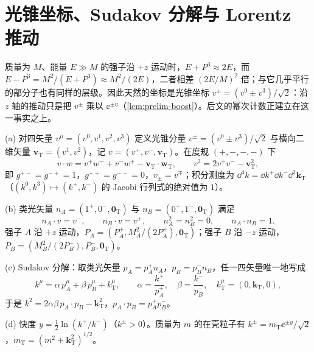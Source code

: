 \section{光锥坐标、Sudakov 分解与 Lorentz 推动}\label{sec:prelim-lightfront}

质量为 $M$、能量 $E\gg M$ 的强子沿 $+z$ 运动时，$E+P^3\approx2E$，而 $E-P^3=M^2/(E+P^3)\approx M^2/(2E)$，二者相差 $(2E/M)^2$ 倍；与它几乎平行的部分子也有同样的层级。因此天然的坐标是光锥坐标 $v^\pm=(v^0\pm v^3)/\sqrt2$：沿 $z$ 轴的推动只是把 $v^\pm$ 乘以 $\ee^{\pm\eta}$（\cref{lem:prelim-boost}）。后文的幂次计数正建立在这一事实之上。

\begin{definition}\label{def:prelim-lightfront}
(a) 对四矢量 $v^\mu=(v^0,v^1,v^2,v^3)$ 定义光锥分量 $v^\pm=(v^0\pm v^3)/\sqrt2$ 与横向二维矢量 $\mathbf v_{\mathrm T}=(v^1,v^2)$，记 $v=(v^+,v^-,\mathbf v_{\mathrm T})$。在度规 $(+,-,-,-)$ 下
\begin{equation}\label{eq:prelim-lc-dot}
v\cdot w=v^+w^-+v^-w^+-\mathbf v_{\mathrm T}\cdot\mathbf w_{\mathrm T},\qquad v^2=2v^+v^--\mathbf v_{\mathrm T}^2 ,
\end{equation}
即 $g^{+-}=g^{-+}=1$，$g^{++}=g^{--}=0$，$v_\pm=v^\mp$；积分测度为 $\dd^4k=\dd k^+\dd k^-\dd^2\mathbf k_{\mathrm T}$（$(k^0,k^3)\mapsto(k^+,k^-)$ 的 Jacobi 行列式的绝对值为 $1$）。%
\par
(b) 类光矢量 $n_A=(1^+,0^-,\mathbf 0_{\mathrm T})$ 与 $n_B=(0^+,1^-,\mathbf 0_{\mathrm T})$ 满足
\begin{equation}\label{eq:prelim-nAnB}
n_A\cdot v=v^-,\qquad n_B\cdot v=v^+,\qquad n_A^2=n_B^2=0,\qquad n_A\cdot n_B=1 .
\end{equation}
强子 $A$ 沿 $+z$ 运动，$P_A=(P_A^+,M_A^2/(2P_A^+),\mathbf 0_{\mathrm T})$；强子 $B$ 沿 $-z$ 运动，$P_B=(M_B^2/(2P_B^-),P_B^-,\mathbf 0_{\mathrm T})$。
\par
(c) Sudakov 分解：取类光矢量 $p_A=p_A^+n_A$，$p_B=p_B^-n_B$，任一四矢量唯一地写成
\begin{equation}\label{eq:prelim-sudakov}
k^\mu=\alpha\,p_A^\mu+\beta\,p_B^\mu+k_{\mathrm T}^\mu,\qquad \alpha=\frac{k^+}{p_A^+},\quad \beta=\frac{k^-}{p_B^-},\quad k_{\mathrm T}^\mu=(0,\mathbf k_{\mathrm T},0),
\end{equation}
于是 $k^2=2\alpha\beta\,p_A\cdot p_B-\mathbf k_{\mathrm T}^2$，$p_A\cdot p_B=p_A^+p_B^-$。
\par
(d) 快度 $y=\frac12\ln(k^+/k^-)$（$k^\pm>0$）。质量为 $m$ 的在壳粒子有 $k^\pm=m_{\mathrm T}\ee^{\pm y}/\sqrt2$，$m_{\mathrm T}=(m^2+\mathbf k_{\mathrm T}^2)^{1/2}$。
\end{definition}


